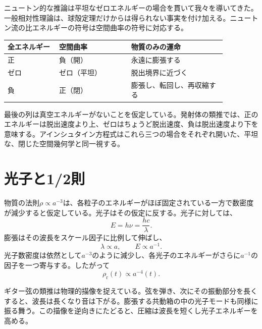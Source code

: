 ニュートン的な推論は平坦なゼロエネルギーの場合を貫いて我々を導いてきた。一般相対性理論は、球殻定理だけからは得られない事実を付け加える。ニュートン流の比エネルギーの符号は空間曲率の符号に対応する。
\begin{center}
\begin{tabular}{@{}>{\raggedright\arraybackslash}p{0.20\linewidth}
                    >{\raggedright\arraybackslash}p{0.29\linewidth}
                    >{\raggedright\arraybackslash}p{0.37\linewidth}@{}}
  \toprule
  全エネルギー & 空間曲率 & 物質のみの運命 \\
  \midrule
  正 & 負（開） & 永遠に膨張する \\
  ゼロ & ゼロ（平坦） & 脱出境界に近づく \\
  負 & 正（閉） & 膨張し、転回し、再収縮する \\
  \bottomrule
\end{tabular}
\end{center}
最後の列は真空エネルギーがないことを仮定している。発射体の類推では、正のエネルギーは脱出速度より上、ゼロはちょうど脱出速度、負は脱出速度より下を意味する。アインシュタイン方程式はこれら三つの場合をそれぞれ開いた、平坦な、閉じた空間幾何学と同一視する。

\section{光子と1/2則}

物質の法則\(\rho\propto a^{-3}\)は、各粒子のエネルギーがほぼ固定されている一方で数密度が減少すると仮定している。光子はその仮定に反する。光子に対しては、
\begin{equation}
  E=h\nu=\frac{hc}{\lambda}.
\end{equation}
膨張はその波長をスケール因子に比例して伸ばし、
\begin{equation}
  \lambda\propto a,
  \qquad E\propto a^{-1}.
\end{equation}
光子数密度は依然として\(a^{-3}\)のように減少し、各光子のエネルギーがさらに\(a^{-1}\)の因子を一つ寄与する。したがって
\begin{equation}
  \boxed{\rho_{\mathrm r}(t)\propto a^{-4}(t)}.
  \label{eq:l09-radiation-dilution}
\end{equation}

ギター弦の類推は物理的描像を捉えている。弦を弾き、次にその振動部分を長くすると、波長は長くなり音は下がる。膨張する共動箱の中の光子モードも同様に振る舞う。この描像を逆向きにたどると、圧縮は波長を短くし光子エネルギーを高める。

